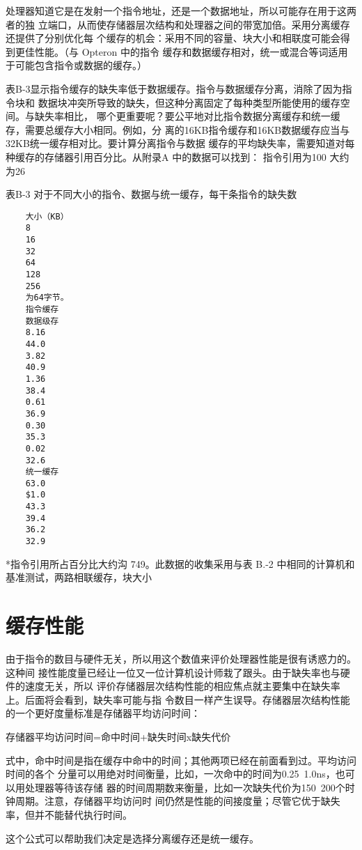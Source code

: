 处理器知道它是在发射一个指令地址，还是一个数据地址，所以可能存在用于这两者的独
立端口，从而使存储器层次结构和处理器之间的带宽加倍。采用分离缓存还提供了分别优化每
个缓存的机会：采用不同的容量、块大小和相联度可能会得到更佳性能。（与 Opteron 中的指令
缓存和数据缓存相对，统一或混合等词适用于可能包含指令或数据的缓存。）

表B-3显示指令缓存的缺失率低于数据缓存。指令与数据缓存分离，消除了因为指令块和
数据块冲突所导致的缺失，但这种分离固定了每种类型所能使用的缓存空间。与缺失率相比，
哪个更重要呢？要公平地对比指令数据分离缓存和统一缓存，需要总缓存大小相同。例如，分
离的16KB指令缓存和16KB数据缓存应当与32KB统一缓存相对比。要计算分离指令与数据
缓存的平均缺失率，需要知道对每种缓存的存储器引用百分比。从附录A 中的数据可以找到：
指令引用为100%
大约为26%

表B-3 对于不同大小的指令、数据与统一缓存，每干条指令的缺失数
\begin{verbatim}
    大小（KB）
    8
    16
    32
    64
    128
    256
    为64字节。
    指令缓存
    数据级存
    8.16
    44.0
    3.82
    40.9
    1.36
    38.4
    0.61
    36.9
    0.30
    35.3
    0.02
    32.6
    统一缓存
    63.0
    $1.0
    43.3
    39.4
    36.2
    32.9
\end{verbatim}
*指令引用所占百分比大约沟 749。此数据的收集采用与表 B.-2 中相同的计算机和基准测试，两路相联缓存，块大小

\section{缓存性能}
由于指令的数目与硬件无关，所以用这个数值来评价处理器性能是很有诱惑力的。这种间
接性能度量已经让一位又一位计算机设计师栽了跟头。由于缺失率也与硬件的速度无关，所以
评价存储器层次结构性能的相应焦点就主要集中在缺失率上。后面将会看到，缺失率可能与指
令数目一样产生误导。存储器层次结构性能的一个更好度量标准是存储器平均访问时间：

存储器平均访问时间=命中时间+缺失时间x缺失代价

式中，命中时间是指在缓存中命中的时间；其他两项已经在前面看到过。平均访问时间的各个
分量可以用绝对时间衡量，比如，一次命中的时间为0.25~1.0ns，也可以用处理器等待该存储
器的时间周期数来衡量，比如一次缺失代价为150~200个时钟周期。注意，存储器平均访问时
间仍然是性能的间接度量；尽管它优于缺失率，但并不能替代执行时间。

这个公式可以帮助我们决定是选择分离缓存还是统一缓存。

